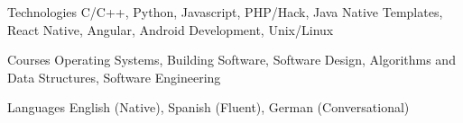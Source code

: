 


\begin{cvskills}


\cvskill
{Technologies} %
{C/C++, Python, Javascript, PHP/Hack, Java   {\cdotp}   Native Templates, React Native, Angular, Android Development, Unix/Linux}%

\cvskill
{Courses}
{Operating Systems, Building Software, Software Design, Algorithms and Data Structures, Software Engineering}

\cvskill
{Languages} %
{English (Native), Spanish (Fluent), German (Conversational)} %


\end{cvskills}